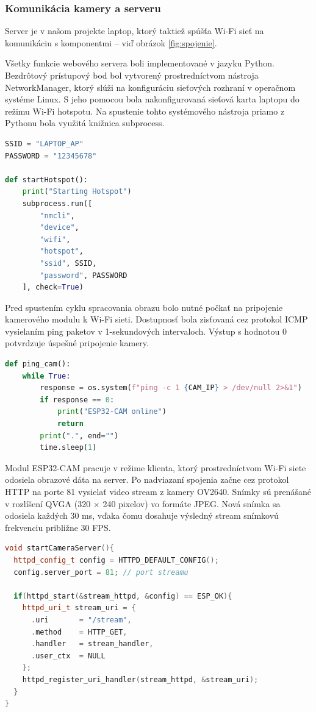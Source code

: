 \subsubsection{Komunikácia kamery a serveru}
Server je v našom projekte laptop, ktorý taktiež spúšťa Wi-Fi sieť na komunikáciu s komponentmi -- viď obrázok \ref{fig:spojenie}.\par
Všetky funkcie webového servera boli implementované v jazyku Python. Bezdrôtový prístupový bod bol vytvorený prostredníctvom nástroja NetworkManager, ktorý slúži na konfiguráciu sieťových rozhraní v operačnom systéme Linux. S jeho pomocou bola nakonfigurovaná sieťová karta laptopu do režimu Wi-Fi hotspotu. Na spustenie tohto systémového nástroja priamo z Pythonu bola využitá knižnica subprocess.\clearpage
\begin{lstlisting}[language=Python, caption=Zapnutie Wi-Fi hotspotu]
SSID = "LAPTOP_AP"
PASSWORD = "12345678"

def startHotspot():
    print("Starting Hotspot")
    subprocess.run([
        "nmcli",
        "device",
        "wifi",
        "hotspot",
        "ssid", SSID,
        "password", PASSWORD
    ], check=True)
\end{lstlisting}
Pred spustením cyklu spracovania obrazu bolo nutné počkať na pripojenie kamerového modulu k Wi-Fi sieti. Dostupnosť bola zisťovaná cez protokol ICMP vysielaním ping paketov v 1-sekundových intervaloch. Výstup s hodnotou 0 potvrdzuje úspešné pripojenie kamery.\par
\begin{lstlisting}[language=Python, caption=Pingovanie IP adresy kamerového modulu]
def ping_cam():
    while True:
        response = os.system(f"ping -c 1 {CAM_IP} > /dev/null 2>&1")
        if response == 0:
            print("ESP32-CAM online")
            return
        print(".", end="")
        time.sleep(1)
\end{lstlisting}
Modul ESP32-CAM pracuje v režime klienta, ktorý prostredníctvom Wi-Fi siete odosiela obrazové dáta na server. Po nadviazaní spojenia začne cez protokol HTTP na porte 81 vysielať video stream z kamery OV2640. Snímky sú prenášané v rozlíšení QVGA (320 × 240 pixelov) vo formáte JPEG. Nová snímka sa odosiela každých 30 ms, vďaka čomu dosahuje výsledný stream snímkovú frekvenciu približne 30 FPS.\clearpage
\begin{lstlisting}[language=C++, caption=Spustenie HTTP stream na ESP32-CAM]
void startCameraServer(){
  httpd_config_t config = HTTPD_DEFAULT_CONFIG();
  config.server_port = 81; // port streamu
  
  if(httpd_start(&stream_httpd, &config) == ESP_OK){
    httpd_uri_t stream_uri = {
      .uri       = "/stream",
      .method    = HTTP_GET,
      .handler   = stream_handler,
      .user_ctx  = NULL
    };
    httpd_register_uri_handler(stream_httpd, &stream_uri);
  }
}
\end{lstlisting}
